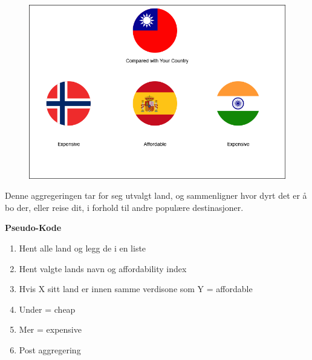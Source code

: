 \FigureCounter
\begin{figure}[H]
  \includegraphics[scale=0.5]{images/milepael3/countriesComparedByExpensiveness.png}
\end{figure}
Denne aggregeringen tar for seg utvalgt land, og sammenligner hvor dyrt det er å bo der, eller reise dit, i forhold til andre populære destinasjoner.

\textbf{Pseudo-Kode}
\begin{enumerate}
  \item Hent alle land og legg de i en liste
  \item Hent valgte lands navn og affordability index
  \item Hvis X sitt land er innen samme verdisone som Y = affordable
  \item Under = cheap
  \item Mer = expensive
  \item Post aggregering
\end{enumerate}

